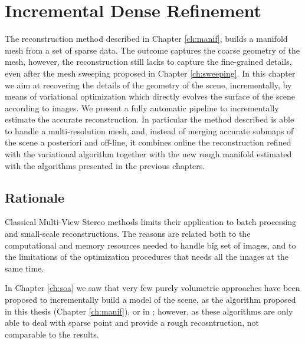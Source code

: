 \chapter{Incremental Dense Refinement}
\label{ch:incrDenseRef}
The reconstruction method described in Chapter \ref{ch:manif}, builds a manifold mesh from a set of sparse data. 
The outcome captures the coarse geometry of the mesh, however, the reconstruction still lacks to capture the fine-grained details, even after the mesh sweeping proposed in Chapter \ref{ch:sweeping}.
In this chapter we aim at recovering the details of the geometry of the scene, incrementally, by means of variational optimization which directly evolves the surface of the scene according to images. 
We present a fully automatic pipeline to incrementally estimate the accurate reconstruction. 
In particular the method described is able to handle a multi-resolution mesh, and, instead of merging accurate submaps of the scene a posteriori and off-line, it combines online the reconstruction refined with the variational algorithm together with the new rough manifold estimated with the algorithms presented in the previous chapters.
\minitoc
\newpage

\section{Rationale}

Classical Multi-View Stereo methods \cite{gargallo2005bayesian,delaunoy_et_al_08} limits their application to batch processing and small-scale reconstructions.
The reasons are related both to the computational and memory resources needed to handle big set of images, and to the limitations of the optimization procedures that needs all the images at the same time.

In Chapter \ref{ch:soa} we saw that very few purely volumetric approaches have been proposed to incrementally build a model of the scene, as the algorithm proposed in this thesis (Chapter \ref{ch:manif}), or in \cite{lovi_et_al_11,hoppe2013incremental,litvinov_lhuillier_13}; however, as these algorithms are  only able to deal with sparse point and provide a rough recosntruction, not comparable to the \mvs results.

